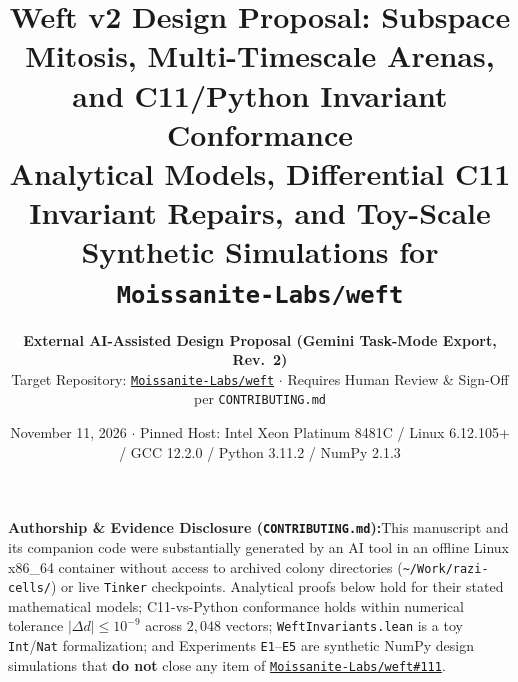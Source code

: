 \documentclass[10pt,a4paper]{article}
\title{\vspace{-8mm}\textbf{\LARGE Weft v2 Design Proposal: Subspace Mitosis, Multi-Timescale Arenas, and C11/Python Invariant Conformance}\\[6pt]
\large Analytical Models, Differential C11 Invariant Repairs, and Toy-Scale Synthetic Simulations for \texttt{Moissanite-Labs/weft}}
\author{\textbf{External AI-Assisted Design Proposal (Gemini Task-Mode Export, Rev.\ 2)}\\
\small Target Repository: \href{https://github.com/Moissanite-Labs/weft}{\texttt{Moissanite-Labs/weft}} $\cdot$ Requires Human Review \& Sign-Off per \texttt{CONTRIBUTING.md}}
\date{\small November 11, 2026 $\cdot$ Pinned Host: Intel Xeon Platinum 8481C / Linux 6.12.105+ / GCC 12.2.0 / Python 3.11.2 / NumPy 2.1.3}
\newcommand{\takeaway}[2]{%
  \vspace{6pt}\noindent\colorbox{primary!8}{%
    \parbox{\dimexpr\linewidth-2\fboxsep\relax}{%
      \vspace{4pt}\textbf{\color{primary}#1:}\hspace{0.5em}#2\vspace{4pt}%
    }%
  }\vspace{6pt}%
}
\begin{document}
\maketitle

\takeaway{Authorship \& Evidence Disclosure (\texttt{CONTRIBUTING.md})}{This manuscript and its companion code were substantially generated by an AI tool in an offline Linux x86\_64 container without access to archived colony directories (\texttt{\textasciitilde/Work/razi-cells/}) or live \texttt{Tinker} checkpoints. Analytical proofs below hold for their stated mathematical models; C11-vs-Python conformance holds within numerical tolerance $|\Delta d| \le 10^{-9}$ across $2{,}048$ vectors; \texttt{WeftInvariants.lean} is a toy \texttt{Int}/\texttt{Nat} formalization; and Experiments \texttt{E1}--\texttt{E5} are synthetic NumPy design simulations that \textbf{do not} close any item of \href{https://github.com/Moissanite-Labs/weft/issues/111}{\texttt{Moissanite-Labs/weft\#111}}.}
\end{document}
